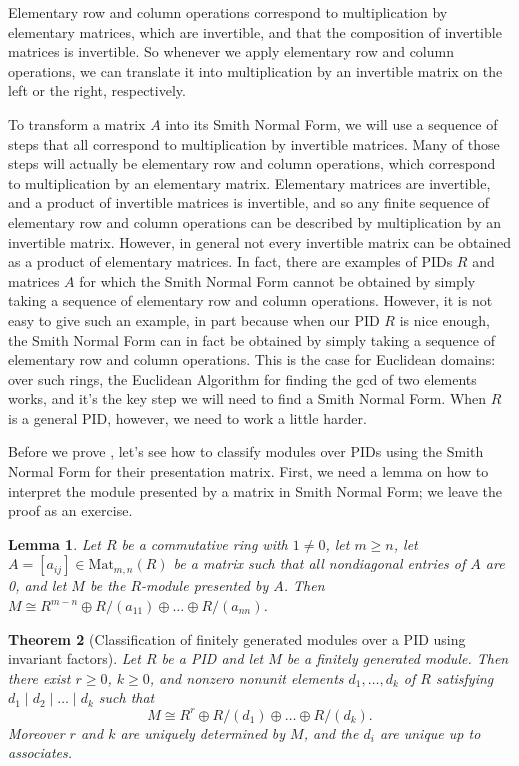 \documentclass[12pt]{report}
\newtheorem{theorem}{Theorem}[chapter]
\newtheorem{lemma}[theorem]{Lemma}
\numberwithin{equation}{section}
\numberwithin{theorem}{chapter}
\theoremstyle{definition}
\newtheorem*{basic properties}{Basic Properties}
\newtheorem*{Important Remark}{Important Remark}
\begin{document}
Elementary row and column operations correspond to multiplication by elementary matrices, which are invertible, and that the composition of invertible matrices is invertible. So whenever we apply elementary row and column operations, we can translate it into multiplication by an invertible matrix on the left or the right, respectively. 

To transform a matrix $A$ into its Smith Normal Form, we will use a sequence of steps that all correspond to multiplication by invertible matrices. Many of those steps will actually be elementary row and column operations, which correspond to multiplication by an elementary matrix. Elementary matrices are invertible, and a product of invertible matrices is invertible, and so any finite sequence of elementary row and column operations can be described by multiplication by an invertible matrix. However, in general not every invertible matrix can be obtained as a product of elementary matrices. In fact, there are examples of PIDs $R$ and matrices $A$ for which the Smith Normal Form cannot be obtained by simply taking a sequence of elementary row and column operations. However, it is not easy to give such an example, in part because when our PID $R$ is nice enough, the Smith Normal Form can in fact be obtained by simply taking a sequence of elementary row and column operations. This is the case for Euclidean domains: over such rings, the Euclidean Algorithm for finding the gcd of two elements works, and it's the key step we will need to find a Smith Normal Form. When $R$ is a general PID, however, we need to work a little harder.


Before we prove , let's see how to classify modules over PIDs using the Smith Normal Form for their presentation matrix. First, we need a lemma on how to interpret the module presented by a matrix in Smith Normal Form; we leave the proof as an exercise.
 
\begin{lemma}\label{module given by SNF}
Let $R$ be a commutative ring with $1 \neq 0$, let $m \geqslant n$, let $A = [a_{ij}] \in \mathrm{Mat}_{m,n}(R)$ be a matrix such that all nondiagonal entries of $A$ are 0, and let $M$ be the $R$-module presented by $A$. Then $M \cong R^{m-n} \oplus R/(a_{11}) \oplus \dots \oplus R/(a_{nn})$.
\end{lemma}




\begin{theorem}[Classification of finitely generated modules over a PID using invariant factors]\label{classification mods over pids}
Let $R$ be a PID and let $M$ be a finitely generated module. Then there exist $r \geqslant 0$, $k \geqslant 0$, and nonzero nonunit elements $d_1,\ldots, d_k$ of $R$ satisfying $d_1 \mid  d_2 \mid \dots \mid d_k$ such that $$M \cong R^r \oplus R/(d_1) \oplus \dots \oplus R/(d_k).$$ Moreover $r$ and $k$ are uniquely determined by $M$, and the $d_i$ are unique up to associates.
\end{theorem}
\end{document}
